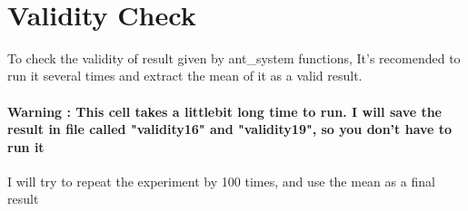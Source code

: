 \documentclass[11pt]{article}
\begin{document}
    \begin{center}
    \end{center}
    { \hspace*{\fill} \\}
    
    \section{Validity Check}\label{validity-check}

To check the validity of result given by ant\_system functions, It's
recomended to run it several times and extract the mean of it as a valid
result.

\paragraph{Warning : This cell takes a littlebit long time to run. I
will save the result in file called "validity16" and "validity19", so
you don't have to run
it}\label{warning-this-cell-takes-a-littlebit-long-time-to-run.-i-will-save-the-result-in-file-called-validity16-and-validity19-so-you-dont-have-to-run-it}

I will try to repeat the experiment by 100 times, and use the mean as a
final result
\end{document}
